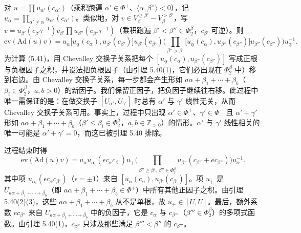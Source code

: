 对 $u=\prod u_{\alpha'}(c_{\alpha'})$（乘积跑遍 $\alpha'\in\Phi^+$、$\langle\alpha,\beta^\vee\rangle<0$），记 $u_{\underline\alpha}=\prod_{\alpha'\neq\alpha}u_{\alpha'}(c_{\alpha'})$。类似地，对 $v\in V^{\ge\beta'}_\beta-V^{>\beta'}_\beta$，写 $v=u_{\beta'}(c_{\beta'}\tau^{-1})v_{\beta'}\prod u_{\beta''}(c_{\beta''}\tau^{-1})$（乘积跑遍 $\beta'<\beta''\in\Phi^\beta_2$，$c_{\beta'}$ 可逆）。则
\begin{equation}
\mathrm{ev}(\mathrm{Ad}(u)v)=u_\alpha\big[u_{\underline\alpha}(c_\alpha),u_{\beta'}(c_{\beta'})\big]u_{\beta'}(c_{\beta'})\Big(\prod_{\beta''>\beta'}\big[u_{\underline\alpha}(c_\alpha),u_{\beta''}(c_{\beta''})\big]u_{\beta''}(c_{\beta''})\Big)u_{\underline\alpha}^{-1}.
\end{equation}
为计算 (5.41)，用 Chevalley 交换子关系把每个 $[u_{\underline\alpha}(c_\alpha),u_{\beta''}(c_{\beta''})]$ 写成正根与负根因子之积，并设法把负根因子（由引理 5.40(1)，它们必出现在 $\Phi^\beta_2$ 中）移到右边。由 Chevalley 交换子关系，每一步都会产生形如 $a\alpha+\beta_1+\cdots+\beta_b$（$\beta_i\in\Phi^\beta_2$，$a,b>0$）的新因子。我们保留正因子，把负因子继续往右移。此过程中唯一需保证的是：在做交换子 $[U_{\alpha'},U_{\gamma'}]$ 时总有 $\alpha'$ 与 $\gamma'$ 线性无关，从而 Chevalley 交换子关系可用。事实上，过程中只出现 $\alpha'\in\Phi^+$、$\gamma'\in\Phi^-$ 且 $\alpha'+\gamma'$ 形如 $a\alpha+\beta_1+\cdots+\beta_b$（$\beta'\le\beta_i\in\Phi^\beta_2$，$a,b\in\mathbb{Z}_{>0}$）的情形。$\alpha'$ 与 $\gamma'$ 线性相关的唯一可能是 $\alpha'+\gamma'=0$，而这已被引理 5.40 排除。

过程结束时得
\begin{equation}
\mathrm{ev}(\mathrm{Ad}(u)v)=u_\alpha u_{\alpha_i}(\epsilon c_\alpha c_{\beta'})u_+\Big(\prod_{\beta''\ge\beta',\ \beta''\in\Phi^\beta_2}u_{\beta''}(c_{\beta''}+e c_{\beta''})\Big)u_{\underline\alpha}^{-1}.
\end{equation}
其中项 $u_{\alpha_i}(\epsilon c_\alpha c_{\beta'})$（$\epsilon=\pm 1$）来自 $[u_\alpha(c_\alpha),u_{\beta'}(c_{\beta'})]$。项 $u_+$ 是 $U_{a\alpha+\beta_1+\cdots+\beta_b}$（即 $a\alpha+\beta_1+\cdots+\beta_b\in\Phi^+$）中所有其他正因子之积。由引理 5.40(2)(3)，这些 $a\alpha+\beta_1+\cdots+\beta_b$ 从不是单根，故 $u_+\in[U,U]$。最后，额外系数 $e c_{\beta''}$ 来自 $U_{a\alpha+\beta_1+\cdots+\beta_b}$ 中的负因子，它是 $c_\alpha$ 与 $c_{\beta'''}$（$\beta'''\in\Phi^\beta_2$）的多项式函数。由引理 5.40(1)，$c_{\beta''}$ 只涉及那些满足 $\beta'''<\beta''$ 的 $c_{\beta'''}$。

